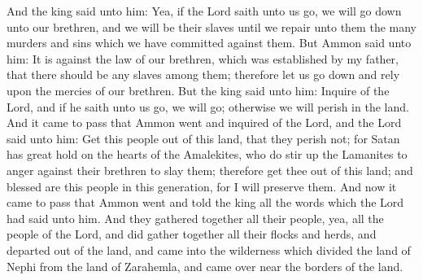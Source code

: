 And the king said unto him: Yea, if the Lord saith unto us go, we will go down unto our brethren, and we will be their slaves until we repair unto them the many murders and sins which we have committed against them.
\bverse \iffalse But Ammon said unto him: It is against the law of our brethren, which was established by my father, that there should be any slaves among them; therefore let us go down and rely upon the mercies of our brethren. \fi
But Ammon said unto him: It is against the law of our brethren, which was established by my father, that there should be any slaves among them; therefore let us go down and rely upon the mercies of our brethren.
\bverse \iffalse But the king said unto him: Inquire of the Lord, and if he saith unto us go, we will go; otherwise we will perish in the land. \fi
But the king said unto him: Inquire of the Lord, and if he saith unto us go, we will go; otherwise we will perish in the land.
\bverse \iffalse And it came to pass that Ammon went and inquired of the Lord, and the Lord said unto him: \fi
And it came to pass that Ammon went and inquired of the Lord, and the Lord said unto him:
\bverse \iffalse Get this people out of this land, that they perish not; for Satan has great hold on the hearts of the Amalekites, who do stir up the Lamanites to anger against their brethren to slay them; therefore get thee out of this land; and blessed are this people in this generation, for I will preserve them. \fi
Get this people out of this land, that they perish not; for Satan has great hold on the hearts of the Amalekites, who do stir up the Lamanites to anger against their brethren to slay them; therefore get thee out of this land; and blessed are this people in this generation, for I will preserve them.
\bverse \iffalse And now it came to pass that Ammon went and told the king all the words which the Lord had said unto him. \fi
And now it came to pass that Ammon went and told the king all the words which the Lord had said unto him.
\bverse \iffalse And they gathered together all their people, yea, all the people of the Lord, and did gather together all their flocks and herds, and departed out of the land, and came into the wilderness which divided the land of Nephi from the land of Zarahemla, and came over near the borders of the land. \fi
And they gathered together all their people, yea, all the people of the Lord, and did gather together all their flocks and herds, and departed out of the land, and came into the wilderness which divided the land of Nephi from the land of Zarahemla, and came over near the borders of the land.
